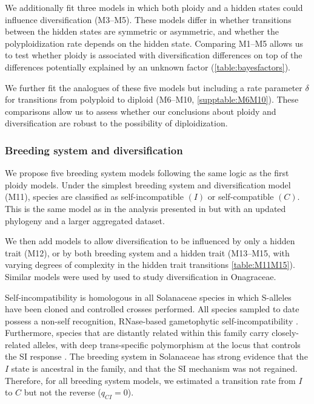 We additionally fit three models in which both ploidy and a hidden states could influence diversification (M3--M5).
These models differ in whether transitions between the hidden states are symmetric or asymmetric, and whether the polyploidization rate depends on the hidden state.
Comparing M1--M5 allows us to test whether ploidy is associated with diversification differences on top of the differences potentially explained by an unknown factor (\cref{table:bayesfactors}).

We further fit the analogues of these five models but including a rate parameter $\delta$ for transitions from polyploid to diploid (M6--M10,  \cref{supptable:M6M10}).
These comparisons allow us to assess whether our conclusions about ploidy and diversification are robust to the possibility of diploidization.

\subsubsection{Breeding system and diversification}

We propose five breeding system models following the same logic as the first ploidy models.
Under the simplest breeding system and diversification model (M11), species are classified as self-incompatible $(I)$ or self-compatible $(C)$.
This is the same model as in the analysis presented in \citet{goldberg_2010} but with an updated phylogeny \citep{sarkinen_2013} and a larger aggregated dataset.

We then add models to allow diversification to be influenced by only a hidden trait (M12), or by both breeding system and a hidden trait (M13--M15, with varying degrees of complexity in the hidden trait transitions \cref{table:M11M15}).
Similar models were used by \citet{freyman_2017} used to study diversification in Onagraceae.

Self-incompatibility is homologous in all Solanaceae species in which S-alleles have been cloned and controlled crosses performed.
All species sampled to date possess a non-self recognition, RNase-based gametophytic self-incompatibility \citep[shared even with other euasterid families;][]{ramanauskas_2017}.
Furthermore, species that are distantly related within this family carry closely-related alleles, with deep trans-specific polymorphism at the locus that controls the SI response \citep{ioerger_1990, igic_2006}.
The breeding system in Solanaceae has strong evidence that the $I$ state is ancestral in the family, and that the SI mechanism was not regained.
Therefore, for all breeding system models, we estimated a transition rate from $I$ to $C$  but not the reverse ($q_{CI}=0$).
%

